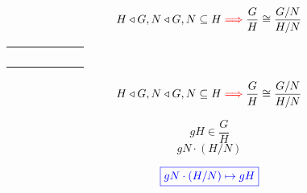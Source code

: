 \begin{frame}
  \begin{theorem}
	\[
	  H \triangleleft G, N \triangleleft G, N \subseteq H \textcolor{red}{\implies} \frac{G}{H} \cong \frac{G/N}{H/N}
	\]
  \end{theorem}

  \begin{table}[]
	\begin{tabular}{|c|c|c|c|c|c|}
	\hline
	 &  &  &  &  &  \\ \hline
	 &  &  &  &  &  \\ \hline
	 &  &  &  &  &  \\ \hline
	 &  &  &  &  &  \\ \hline
	 &  &  &  &  &  \\ \hline
	\end{tabular}
  \end{table}

  \begin{center}
  \end{center}
\end{frame}

\begin{frame}
  \begin{theorem}
	\[
	  H \triangleleft G, N \triangleleft G, N \subseteq H \textcolor{red}{\implies} \frac{G}{H} \cong \frac{G/N}{H/N}
	\]
  \end{theorem}
  
  \begin{center}
	 \pause
	\[
	  gH \in \frac{G}{H}
	\]
	\pause
	 \pause
	\[
	  gN \cdot (H/N)
	\]
  \end{center}

  \pause
  \vspace{-0.60cm}
  \[
	\textcolor{blue}{\boxed{gN \cdot (H/N) \mapsto gH}}
  \]

  \pause
  \begin{center}
  \end{center}
\end{frame}

